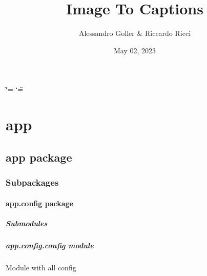 \documentclass[letterpaper,10pt,english]{sphinxmanual}
\title{Image To Captions}
\date{May 02, 2023}
\author{Alessandro Goller \& Riccardo Ricci}
\begin{document}
\ifdefined\shorthandoff
  \ifnum\catcode`\=\string=\active\shorthandoff{=}\fi
  \ifnum\catcode`\"=\active{}\fi
\fi

\pagestyle{empty}
\sphinxmaketitle
\pagestyle{plain}
\sphinxtableofcontents
\pagestyle{normal}
\label{\detokenize{index::doc}}



\chapter{app}
\label{\detokenize{index:app}}
\sphinxstepscope


\section{app package}
\label{\detokenize{app:app-package}}\label{\detokenize{app::doc}}

\subsection{Subpackages}
\label{\detokenize{app:subpackages}}
\sphinxstepscope


\subsubsection{app.config package}
\label{\detokenize{app.config:app-config-package}}\label{\detokenize{app.config::doc}}

\paragraph{Submodules}
\label{\detokenize{app.config:submodules}}

\paragraph{app.config.config module}
\label{\detokenize{app.config:module-app.config.config}}\label{\detokenize{app.config:app-config-config-module}}
\sphinxAtStartPar
Module with all config
\end{document}
